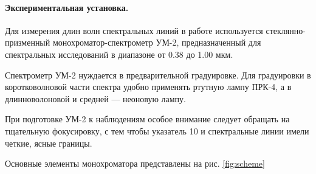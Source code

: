 \documentclass[a4paper, 12pt]{article}
\begin{document}
\paragraph{Экспериментальная установка.}
Для измерения длин волн спектральных линий в работе используется стеклянно-призменный монохроматор-спектрометр УМ-2, предназначенный для спектральных исследований в диапазоне от 0.38 до 1.00 мкм.\par
Спектрометр УМ-2 нуждается в предварительной градуировке. Для градуировки в коротковолновой части спектра удобно применять ртутную лампу ПРК-4, а в длинноволоновой и средней --- неоновую лампу.\par
При подготовке УМ-2 к наблюдениям особое внимание следует обращать на тщательную фокусировку, с тем чтобы указатель 10 и спектральные линии имели четкие, ясные границы.\par
Основные элементы монохроматора представлены на рис. \ref{fig:scheme}\par
\end{document}
